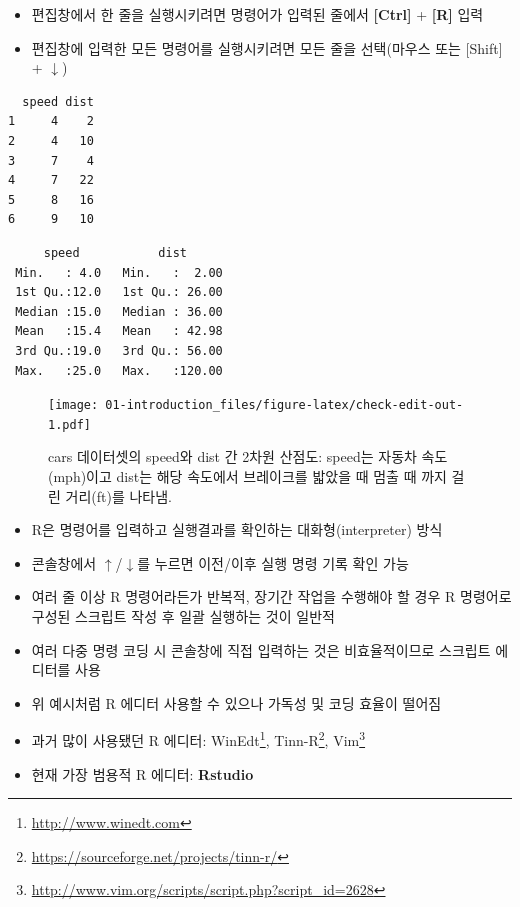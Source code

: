 \documentclass[
  11pt,
]{krantz}
\providecommand{\tightlist}{%
  \setlength{\itemsep}{0pt}\setlength{\parskip}{0pt}}
\renewcommand{\href}[2]{#2\footnote{\url{#1}}}
\begin{document}
\normalsize

\begin{itemize}
\tightlist
\item
  편집창에서 한 줄을 실행시키려면 명령어가 입력된 줄에서 \textbf{{[}Ctrl{]}} + \textbf{{[}R{]}} 입력
\item
  편집창에 입력한 모든 명령어를 실행시키려면 모든 줄을 선택(마우스 또는 {[}Shift{]} + \(\downarrow\))
\end{itemize}

\footnotesize

\begin{verbatim}
  speed dist
1     4    2
2     4   10
3     7    4
4     7   22
5     8   16
6     9   10
\end{verbatim}

\begin{verbatim}
     speed           dist       
 Min.   : 4.0   Min.   :  2.00  
 1st Qu.:12.0   1st Qu.: 26.00  
 Median :15.0   Median : 36.00  
 Mean   :15.4   Mean   : 42.98  
 3rd Qu.:19.0   3rd Qu.: 56.00  
 Max.   :25.0   Max.   :120.00  
\end{verbatim}

\begin{figure}
\centering
\texttt{[image: 01-introduction\_files/figure-latex/check-edit-out-1.pdf]}
\caption{\label{fig:check-edit-out}cars 데이터셋의 speed와 dist 간 2차원 산점도: speed는 자동차 속도(mph)이고 dist는 해당 속도에서 브레이크를 밟았을 때 멈출 때 까지 걸린 거리(ft)를 나타냄.}
\end{figure}

\normalsize

\begin{itemize}
\tightlist
\item
  R은 명령어를 입력하고 실행결과를 확인하는 대화형(interpreter) 방식
\item
  콘솔창에서 \(\uparrow\)/\(\downarrow\)를 누르면 이전/이후 실행 명령 기록 확인 가능
\item
  여러 줄 이상 R 명령어라든가 반복적, 장기간 작업을 수행해야 할 경우 R 명령어로 구성된 스크립트 작성 후 일괄 실행하는 것이 일반적
\item
  여러 다중 명령 코딩 시 콘솔창에 직접 입력하는 것은 비효율적이므로 스크립트 에디터를 사용
\item
  위 예시처럼 R 에디터 사용할 수 있으나 가독성 및 코딩 효율이 떨어짐
\item
  과거 많이 사용됐던 R 에디터: \href{http://www.winedt.com}{WinEdt}, \href{https://sourceforge.net/projects/tinn-r/}{Tinn-R}, \href{http://www.vim.org/scripts/script.php?script_id=2628}{Vim}
\item
  현재 가장 범용적 R 에디터: \textbf{Rstudio}
\end{itemize}
\end{document}
